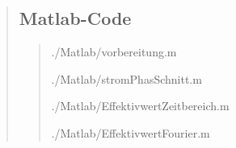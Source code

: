 \begin{quote}
\subsection{Matlab-Code}
    \begin{quote}
        
        
            {./Matlab/vorbereitung.m}
            
            
            {./Matlab/stromPhasSchnitt.m}
        
        
            {./Matlab/EffektivwertZeitbereich.m}


        
            {./Matlab/EffektivwertFourier.m}


    \end{quote}


    


\end{quote}






% 
% 
% 



